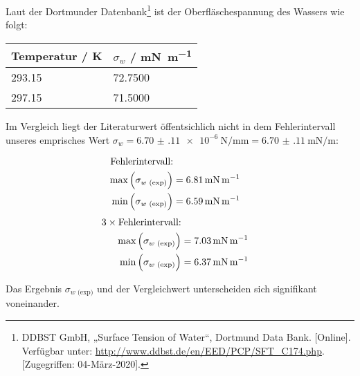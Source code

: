 			Laut der Dortmunder Datenbank\footnote{DDBST GmbH, „Surface Tension of Water“, Dortmund Data Bank. [Online]. Verfügbar unter: \url{http://www.ddbst.de/en/EED/PCP/SFT_C174.php}. [Zugegriffen: 04-März-2020].} ist der Oberfläschespannung des Wassers wie folgt:

			\begin{center}
				\begin{tabular}{ll}
					\toprule
					Temperatur / \si{\kelvin} & $\sigma_w$ / \si{\milli\newton\per\meter} \\
					\midrule
					\num{293.15} & \num{72.7500} \\
					\num{297.15} & \num{71.5000} \\
					\bottomrule
				\end{tabular}
			\end{center}

			Im Vergleich liegt der Literaturwert öffentsichlich nicht in dem Fehlerintervall unseres emprisches Wert $\sigma_w = \SI{6.70(11)e-6}{\newton\per\milli\meter} = \SI{6.70(11)}{\milli\newton\per\meter}$:
			\begin{multicols}{2}
				\noindent
		        \begin{align*}
		        	\text{Fehlerintervall:} \\
		            \text{max}\left(\sigma_{w\text{ (exp)}}\right) &= \SI{6.81}{\milli\newton\per\meter} \\
		            \text{min}\left(\sigma_{w\text{ (exp)}}\right) &= \SI{6.59}{\milli\newton\per\meter}
		        \end{align*}
		        \begin{align*}
		        	3 \times \text{Fehlerintervall:} \\
		            \text{max}\left(\sigma_{w\text{ (exp)}}\right) &= \SI{7.03}{\milli\newton\per\meter} \\
		            \text{min}\left(\sigma_{w\text{ (exp)}}\right) &= \SI{6.37}{\milli\newton\per\meter}
		        \end{align*}
		    \end{multicols}

		    Das Ergebnis $\sigma_{w\text{ (exp)}}$ und der Vergleichwert unterscheiden sich signifikant voneinander. 

